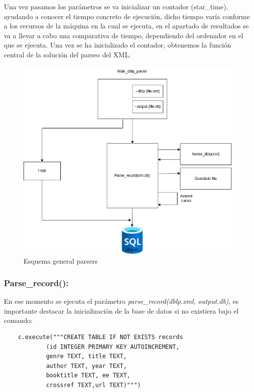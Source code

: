 \documentclass[a4paper, 12pt]{book}
\begin{document}
Una vez pasamos los parámetros se va inicializar un contador (star\_time), ayudando a conocer el tiempo concreto de ejecución, dicho tiempo varía conforme a los recursos de la máquina en la cual se ejecuta, en el apartado de resultados se va a llevar a cabo una comparativa de tiempo, dependiendo del ordenador en el que se ejecuta. 
Una vez se ha inicializado el contador, obtenemos la función central de la solución del parseo del XML. 

\begin{figure}[h]
  \centering
  \includegraphics[width=15cm, keepaspectratio]{img/main_dblp_parser_par.png}
  \caption{Esquema general parsers}
  \label{fig:dblp_parser}
\end{figure}

\subsubsection{Parse\_record():}

En ese momento se ejecuta el parámetro \textit{parse\_record(dblp.xml, output.db)}, es importante destacar la inicialización de la base de datos si no existiera bajo el comando: 

\begin{verbatim}
    c.execute("""CREATE TABLE IF NOT EXISTS records
            (id INTEGER PRIMARY KEY AUTOINCREMENT, 
            genre TEXT, title TEXT,
            author TEXT, year TEXT, 
            booktitle TEXT, ee TEXT, 
            crossref TEXT,url TEXT)""")
\end{verbatim}
\end{document}
